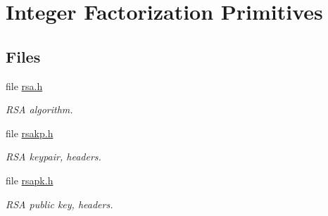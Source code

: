 \hypertarget{group__IF__m}{
\section{Integer Factorization Primitives}
\label{group__IF__m}
}
\subsection*{Files}
\begin{CompactItemize}
\item 
file \hyperlink{rsa_8h}{rsa.h}
\begin{CompactList}\small\item\em RSA algorithm. \item\end{CompactList}

\item 
file \hyperlink{rsakp_8h}{rsakp.h}
\begin{CompactList}\small\item\em RSA keypair, headers. \item\end{CompactList}

\item 
file \hyperlink{rsapk_8h}{rsapk.h}
\begin{CompactList}\small\item\em RSA public key, headers. \item\end{CompactList}

\end{CompactItemize}
